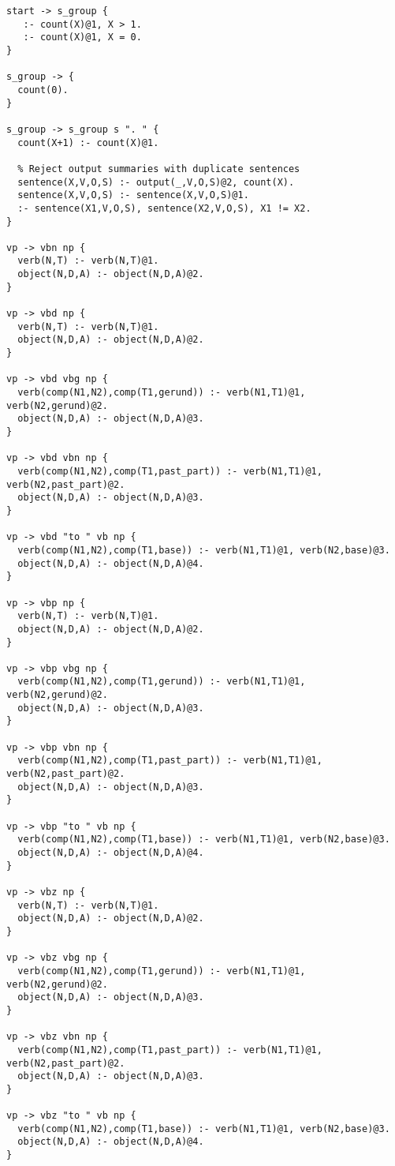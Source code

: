 \begin{lstlisting}
start -> s_group {
   :- count(X)@1, X > 1.
   :- count(X)@1, X = 0.
}

s_group -> {
  count(0).
}

s_group -> s_group s ". " {
  count(X+1) :- count(X)@1.

  % Reject output summaries with duplicate sentences
  sentence(X,V,O,S) :- output(_,V,O,S)@2, count(X).
  sentence(X,V,O,S) :- sentence(X,V,O,S)@1.
  :- sentence(X1,V,O,S), sentence(X2,V,O,S), X1 != X2.
}

vp -> vbn np {
  verb(N,T) :- verb(N,T)@1.
  object(N,D,A) :- object(N,D,A)@2.
}

vp -> vbd np {
  verb(N,T) :- verb(N,T)@1.
  object(N,D,A) :- object(N,D,A)@2.
}

vp -> vbd vbg np {
  verb(comp(N1,N2),comp(T1,gerund)) :- verb(N1,T1)@1, verb(N2,gerund)@2.
  object(N,D,A) :- object(N,D,A)@3.
}

vp -> vbd vbn np {
  verb(comp(N1,N2),comp(T1,past_part)) :- verb(N1,T1)@1, verb(N2,past_part)@2.
  object(N,D,A) :- object(N,D,A)@3.
}

vp -> vbd "to " vb np {
  verb(comp(N1,N2),comp(T1,base)) :- verb(N1,T1)@1, verb(N2,base)@3.
  object(N,D,A) :- object(N,D,A)@4.
}

vp -> vbp np {
  verb(N,T) :- verb(N,T)@1.
  object(N,D,A) :- object(N,D,A)@2.
}

vp -> vbp vbg np {
  verb(comp(N1,N2),comp(T1,gerund)) :- verb(N1,T1)@1, verb(N2,gerund)@2.
  object(N,D,A) :- object(N,D,A)@3.
}

vp -> vbp vbn np {
  verb(comp(N1,N2),comp(T1,past_part)) :- verb(N1,T1)@1, verb(N2,past_part)@2.
  object(N,D,A) :- object(N,D,A)@3.
}

vp -> vbp "to " vb np {
  verb(comp(N1,N2),comp(T1,base)) :- verb(N1,T1)@1, verb(N2,base)@3.
  object(N,D,A) :- object(N,D,A)@4.
}

vp -> vbz np {
  verb(N,T) :- verb(N,T)@1.
  object(N,D,A) :- object(N,D,A)@2.
}

vp -> vbz vbg np {
  verb(comp(N1,N2),comp(T1,gerund)) :- verb(N1,T1)@1, verb(N2,gerund)@2.
  object(N,D,A) :- object(N,D,A)@3.
}

vp -> vbz vbn np {
  verb(comp(N1,N2),comp(T1,past_part)) :- verb(N1,T1)@1, verb(N2,past_part)@2.
  object(N,D,A) :- object(N,D,A)@3.
}

vp -> vbz "to " vb np {
  verb(comp(N1,N2),comp(T1,base)) :- verb(N1,T1)@1, verb(N2,base)@3.
  object(N,D,A) :- object(N,D,A)@4.
}


\end{lstlisting}
